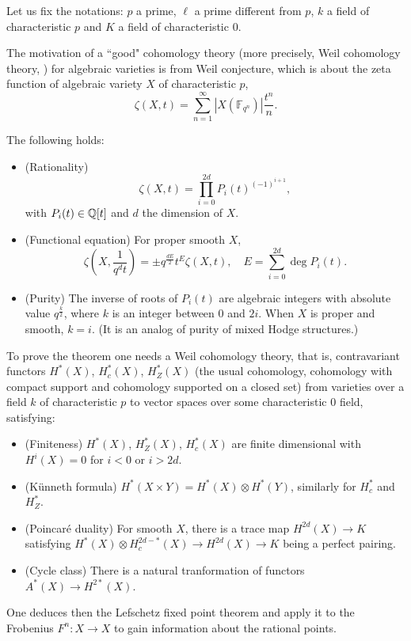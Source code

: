 Let us fix the notations: $p$ a prime, $\ell$ a prime different from $p$, 
$k$ a field of characteristic $p$ and $K$ a field of characteristic $0$.

The motivation of a ``good" cohomology theory 
(more precisely, Weil cohomology theory, \cite{Sta}) 
for algebraic varieties is from Weil conjecture, 
which is about the zeta function of algebraic variety $X$ of characteristic $p$,
\[
    \zeta(X, t)=\sum_{n = 1} ^ {\infty} |X(\mathbb{F} _ {q^n})| \frac {t^n} {n}.
\]
\begin{theorem}
    The following holds:
    \begin{itemize}
        \item (Rationality) 
            \[
                \zeta(X, t) = \prod _ {i = 0} ^ {2d} P_i(t) ^ {(-1) ^ {i + 1}},
            \]
            with $P_i(t)\in {\mathbb {Q}}[t]$ and $d$ the dimension of $X$.
        \item (Functional equation) 
            For proper smooth $X$, 
            \[
                \zeta(X, \frac {1} {q^d t})=\pm q^{\frac {dE} {2}} t^E \zeta(X, t), 
                \quad E = \sum_{i = 0}^{2d} \deg P_i(t).
            \]
        \item (Purity) 
            The inverse of roots of $P_i(t)$ are algebraic integers 
            with absolute value $q^{\frac{k}{2}}$, 
            where $k$ is an integer between $0$ and $2i$. 
            When $X$ is proper and smooth, $k=i$. 
            (It is an analog of purity of mixed Hodge structures.)
    \end{itemize}
\end{theorem}
To prove the theorem one needs a Weil cohomology theory, 
that is, contravariant functors $H^*(X)$, $H^*_c(X)$, $H^*_Z(X)$ 
(the usual cohomology, cohomology with compact support and cohomology supported on a closed set) 
from varieties over a field $k$ of characteristic $p$ 
to vector spaces over some characteristic $0$ field, satisfying:
\begin{itemize}
    \item (Finiteness) 
        $H^*(X)$, $H^*_Z(X)$, $H^*_c(X)$ are finite dimensional 
        with $H^i(X) = 0$ for $i < 0$ or $i > 2d$.
    \item (K\"unneth formula) 
        $H^*(X\times Y) = H^*(X) \otimes H^*(Y)$, 
        similarly for $H^*_c$ and $H^*_Z$. 
    \item (Poincar\'e duality) 
        For smooth $X$, there is a trace map $H^{2d}(X) \to K$ satisfying 
        $H^*(X) \otimes H^{2d-*}_c(X) \to H^{2d}(X) \to K$ being a perfect pairing.
    \item (Cycle class) 
        There is a natural tranformation of functors $A^*(X) \to H^{2*}(X)$.
\end{itemize}
One deduces then the Lefschetz fixed point theorem 
and apply it to the Frobenius $F^n \colon X \to X$ 
to gain information about the rational points.

